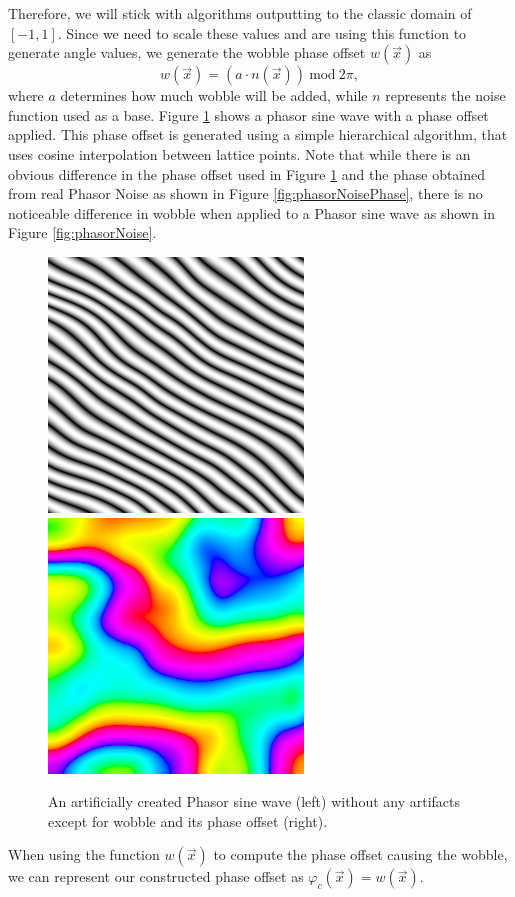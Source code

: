 \documentclass{utue} %
\begin{document}
Therefore, we will stick with algorithms outputting to the classic domain of $[-1,1]$. Since we need to scale these values and are using this function to generate angle values, we generate the wobble phase offset $w(\vec{x})$ as
$$
w(\vec{x}) = (a\cdot n(\vec{x}))\ \mathrm{mod}\ 2\pi,
$$
where $a$ determines how much wobble will be added, while $n$ represents the noise function used as a base. Figure \ref{fig:wobble} shows a phasor sine wave with a phase offset applied. This phase offset is generated using a simple hierarchical algorithm, that uses cosine interpolation between lattice points. Note that while there is an obvious difference in the phase offset used in Figure \ref{fig:wobble} and the phase obtained from real Phasor Noise as shown in Figure \ref{fig:phasorNoisePhase}, there is no noticeable difference in wobble when applied to a Phasor sine wave as shown in Figure \ref{fig:phasorNoise}.
\begin{figure}[h]
  \centering
  \includegraphics[width=0.49\linewidth]{images/wobble}
  \includegraphics[width=0.49\linewidth]{images/wobblePhase}
  \caption{An artificially created Phasor sine wave (left) without any artifacts except for wobble and its phase offset (right).}\label{fig:wobble}
\end{figure}
When using the function $w(\vec{x})$ to compute the phase offset causing the wobble, we can represent our constructed phase offset as $\varphi_c(\vec{x}) = w(\vec{x})$.
\end{document}
